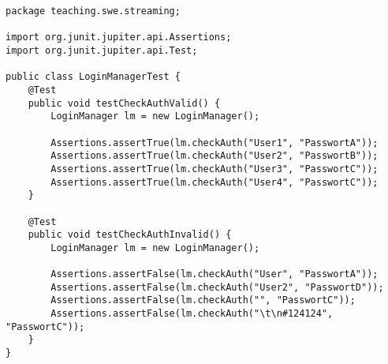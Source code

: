 \begin{lstlisting}[style=javastyle]
package teaching.swe.streaming;

import org.junit.jupiter.api.Assertions;
import org.junit.jupiter.api.Test;

public class LoginManagerTest {
    @Test
    public void testCheckAuthValid() {
        LoginManager lm = new LoginManager();

        Assertions.assertTrue(lm.checkAuth("User1", "PasswortA"));
        Assertions.assertTrue(lm.checkAuth("User2", "PasswortB"));
        Assertions.assertTrue(lm.checkAuth("User3", "PasswortC"));
        Assertions.assertTrue(lm.checkAuth("User4", "PasswortC"));
    }

    @Test
    public void testCheckAuthInvalid() {
        LoginManager lm = new LoginManager();

        Assertions.assertFalse(lm.checkAuth("User", "PasswortA"));
        Assertions.assertFalse(lm.checkAuth("User2", "PasswortD"));
        Assertions.assertFalse(lm.checkAuth("", "PasswortC"));
        Assertions.assertFalse(lm.checkAuth("\t\n#124124", "PasswortC"));
    }
}
\end{lstlisting}